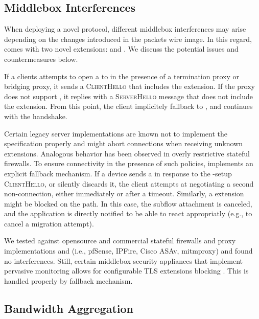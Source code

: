 \subsection{Middlebox Interferences}

When deploying a novel protocol, different middlebox interferences may arise
depending on the changes introduced in the packets wire image. In this
regard, \tcpls comes with two novel \tls extensions: \tcpls and \join.
We discuss the potential issues and countermeasures below.

If a clients attempts to open a \tcpls to in the presence of a \tls termination
proxy or bridging proxy, it sends a \textsc{ClientHello} that includes
the \tcpls extension.
If the proxy does not support \tcpls, it replies with a \textsc{ServerHello}
message that does not include the \tcpls extension. From this point, the client
implicitely fallback to \tls, and continues with the handshake.

Certain legacy \tls server implementations are known not to implement the \tls
specification properly and might abort connections when receiving unknown \tls
extensions. Analogous behavior has been observed in overly restrictive stateful
firewalls.  To ensure connectivity in the presence of such policies, \tcpls
implements an explicit fallback mechanism. If a device sends a \tcp \rst in
response to the \tcpls-setup \textsc{ClientHello}, or silently discards it,
the client attempts at negotiating a second non-\tcpls \tls connection, either
immediately or after a timeout. Similarly, a \tcpls \join extension might be
blocked on the path. In this case, the subflow attachment is canceled, and
the application is directly notified to be able to react appropriatly (e.g.,
to cancel a migration attempt).

We tested \tcpls against opensource and commercial stateful firewalls and proxy
implementations and (i.e., pfSense, IPFire, Cisco ASAv, mitmproxy) and found no
interferences. Still, certain middlebox security appliances that implement
pervasive monitoring allows for configurable TLS extensions blocking
\cite{rfc7258}. This is handled properly by \tcpls fallback mechanism.


\subsection{Bandwidth Aggregation}

